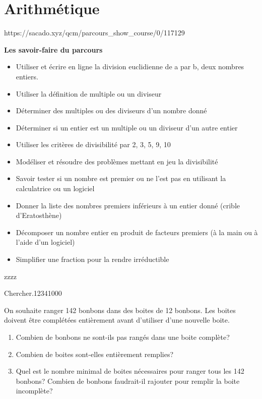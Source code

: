 \chapter{Arithmétique}
{https://sacado.xyz/qcm/parcours_show_course/0/117129}
{
 \begin{CpsCol}
\textbf{Les savoir-faire du parcours}
 \begin{itemize}
 \item Utiliser et écrire en ligne la division euclidienne de a par b, deux nombres entiers.
 \item Utiliser la définition de multiple ou un diviseur
 \item Déterminer des multiples ou des diviseurs d’un nombre donné
 \item Déterminer si un entier est un multiple ou un diviseur d’un autre entier
 \item Utiliser les critères de divisibilité par 2, 3, 5, 9, 10
 \item Modéliser et résoudre des problèmes mettant en jeu la divisibilité
 \item Savoir tester si un nombre est premier ou ne l'est pas en utilisant la calculatrice ou un logiciel
 \item Donner la liste des nombres premiers inférieurs à un entier donné (crible d'Eratosthène)
 \item Décomposer un nombre entier en produit de facteurs premiers (à la main ou à l'aide d'un logiciel)
 \item Simplifier une fraction pour la rendre irréductible
 \end{itemize}
 
 \end{CpsCol}
 
 \begin{His}
 zzzz
 \end{His}

\begin{ExoDec}{Chercher.}{1234}{1}{0}{0}{0}

 On souhaite ranger 142 bonbons dans des boites de 12 bonbons. Les boites doivent être complétées entièrement avant
d'utiliser d'une nouvelle boite.
\begin{enumerate}
\item Combien de bonbons ne sont-ils pas rangés dans une boite complète?
\item Combien de boites sont-elles entièrement remplies?
\item Quel est le nombre minimal de boites nécessaires pour ranger tous les 142 bonbons? Combien de bonbons faudrait-il
rajouter pour remplir la boite incomplète?
\end{enumerate}


\end{ExoDec}}
